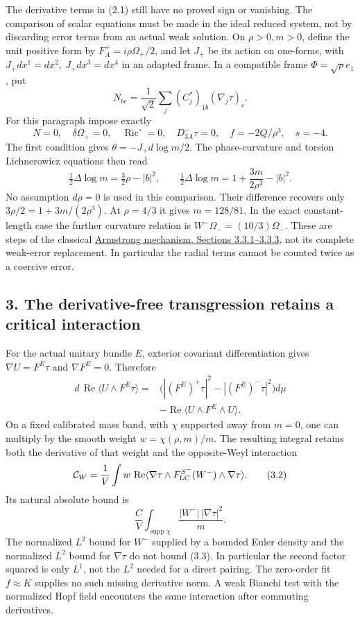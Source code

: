 \documentclass[
  10pt,
]{article}
\begin{document}
The derivative terms in (2.1) still have no proved sign or vanishing.
The comparison of scalar equations must be made in the ideal reduced
system, not by discarding error terms from an actual weak solution. On
\(\rho>0,m>0\), define the unit positive form by
\(F_A^+=i\rho\Omega_+/2\), and let \(J_+\) be its action on one-forms,
with \(J_+dx^1=dx^2,\ J_+dx^3=dx^4\) in an adapted frame. In a
compatible frame \(\Phi=\sqrt\rho e_1\), put \[
 N_{bc}=\frac1{\sqrt2}\sum_j(C_j^*)_{1b}(\nabla_j\tau)_c .
\] For this paragraph impose exactly \[
 N=0,\quad \delta\Omega_+=0,\quad
 \operatorname{Ric}^{\circ}=0,\quad D^-_{3A}\tau=0,\quad
 f=-2Q/\rho^3,\quad s=-4.
\] The first condition gives \(\theta=-J_+d\log m/2\). The
phase-curvature and torsion Lichnerowicz equations then read \[
 \tfrac12\Delta\log m=\tfrac32\rho-|b|^2,\qquad
 \tfrac12\Delta\log m=1+\frac{3m}{2\rho^3}-|b|^2 .
\] No assumption \(d\rho=0\) is used in this comparison. Their
difference recovers only \(3\rho/2=1+3m/(2\rho^3)\). At \(\rho=4/3\) it
gives \(m=128/81\). In the exact constant-length case the further
curvature relation is \(W^-\Omega_-=(10/3)\Omega_-\). These are steps of
the classical
\href{https://johnarmstrongmaths.com/publications/resources/thesis.pdf}{Armstrong
mechanism, Sections 3.3.1--3.3.3}, not its complete weak-error
replacement. In particular the radial terms cannot be counted twice as a
coercive error.

\hypertarget{the-derivative-free-transgression-retains-a-critical-interaction}{%
\subsection{3. The derivative-free transgression retains a critical
interaction}\label{the-derivative-free-transgression-retains-a-critical-interaction}}

For the actual unitary bundle \(E\), exterior covariant differentiation
gives \(\nabla U=F^E\tau\) and \(\nabla F^E=0\). Therefore \[
\begin{aligned}
 d\,\operatorname{Re}\langle U\wedge F^E\tau\rangle
  ={}&\bigl(|(F^E)^+\tau|^2-|(F^E)^-\tau|^2\bigr)d\mu\\
     &-\operatorname{Re}\langle U\wedge F^E\wedge U\rangle .
\end{aligned}                                                   \tag{3.1}
\] On a fixed calibrated mass band, with \(\chi\) supported away from
\(m=0\), one can multiply by the smooth weight \(w=\chi(\rho,m)/m\). The
resulting integral retains both the derivative of that weight and the
opposite-Weyl interaction \[
 \mathcal C_W=\frac1V\int w\,
  \operatorname{Re}\langle\nabla\tau\wedge
      F_{\rm LC}^{S^-}(W^-)\wedge\nabla\tau\rangle .     \tag{3.2}
\] Its natural absolute bound is \[
 \frac C V\int_{\operatorname{supp}\chi}
       \frac{|W^-|\,|\nabla\tau|^2}{m}.               \tag{3.3}
\] The normalized \(L^2\) bound for \(W^-\) supplied by a bounded Euler
density and the normalized \(L^2\) bound for \(\nabla\tau\) do not bound
(3.3). In particular the second factor squared is only \(L^1\), not the
\(L^2\) needed for a direct pairing. The zero-order fit \(f\approx K\)
supplies no such missing derivative norm. A weak Bianchi test with the
normalized Hopf field encounters the same interaction after commuting
derivatives.
\end{document}
